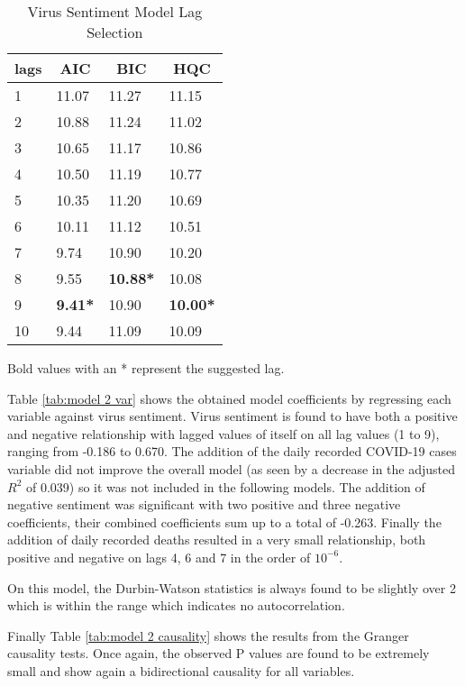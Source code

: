 \begin{table}[H]
\centering
\begin{tabular}{@{}llll@{}}
\toprule
\multicolumn{1}{c}{\textbf{lags}} & \multicolumn{1}{c}{\textbf{AIC}} & \multicolumn{1}{c}{\textbf{BIC}} & \multicolumn{1}{c}{\textbf{HQC}} \\ \midrule
1 & 11.07 & 11.27 & 11.15 \\
2 & 10.88 & 11.24 & 11.02 \\
3 & 10.65 & 11.17 & 10.86 \\
4 & 10.50 & 11.19 & 10.77 \\
5 & 10.35 & 11.20 & 10.69 \\
6 & 10.11 & 11.12 & 10.51 \\
7 & 9.74 & 10.90 & 10.20 \\
8 & 9.55 & \textbf{10.88*} & 10.08 \\
9 & \textbf{9.41*} & 10.90 & \textbf{10.00*} \\
10 & 9.44 & 11.09 & 10.09 \\ \bottomrule
\end{tabular}
\caption{Virus Sentiment Model Lag Selection}
\label{tab:model 2 lag}
Bold values with an * represent the suggested lag.
\end{table}


Table \ref{tab:model 2 var} shows the obtained model coefficients by regressing each variable against virus sentiment. Virus sentiment is found to have both a positive and negative relationship with lagged values of itself on all lag values (1 to 9), ranging from -0.186 to 0.670. The addition of the daily recorded COVID-19 cases variable did not improve the overall model (as seen by a decrease in the adjusted $R^2$ of 0.039) so it was not included in the following models.  The addition of negative sentiment was significant with two positive and three negative coefficients, their combined coefficients sum up to a total of -0.263. Finally the addition of daily recorded deaths resulted in a very small relationship, both positive and negative on lags 4, 6 and 7 in the order of $10^{-6}$.

On this model, the Durbin-Watson statistics is always found to be slightly over 2 which is within the range which indicates no autocorrelation.

Finally Table \ref{tab:model 2 causality} shows the results from the Granger causality tests. Once again, the observed P values are found to be extremely small and show again a bidirectional causality for all variables.

